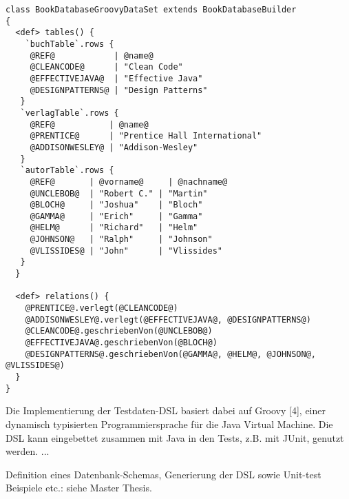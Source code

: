 \begin{lstlisting}[caption=DataSet modelliert mit dem Table Builder API, style=java, label=listing:dsl]
class BookDatabaseGroovyDataSet extends BookDatabaseBuilder
{
  <def> tables() {
    `buchTable`.rows {
     @REF@            | @name@
     @CLEANCODE@      | "Clean Code"      
     @EFFECTIVEJAVA@  | "Effective Java"  
     @DESIGNPATTERNS@ | "Design Patterns" 
   }
   `verlagTable`.rows {
     @REF@           | @name@
     @PRENTICE@      | "Prentice Hall International"
     @ADDISONWESLEY@ | "Addison-Wesley"
   }
   `autorTable`.rows {
     @REF@       | @vorname@     | @nachname@
     @UNCLEBOB@  | "Robert C." | "Martin"
     @BLOCH@     | "Joshua"    | "Bloch"
     @GAMMA@     | "Erich"     | "Gamma"
     @HELM@      | "Richard"   | "Helm"
     @JOHNSON@   | "Ralph"     | "Johnson"
     @VLISSIDES@ | "John"      | "Vlissides"    
   }
  }

  <def> relations() {
    @PRENTICE@.verlegt(@CLEANCODE@)
    @ADDISONWESLEY@.verlegt(@EFFECTIVEJAVA@, @DESIGNPATTERNS@)
    @CLEANCODE@.geschriebenVon(@UNCLEBOB@)
    @EFFECTIVEJAVA@.geschriebenVon(@BLOCH@)
    @DESIGNPATTERNS@.geschriebenVon(@GAMMA@, @HELM@, @JOHNSON@, @VLISSIDES@)
  }
}
\end{lstlisting}


Die Implementierung der Testdaten-DSL basiert dabei auf Groovy [4], einer dynamisch typisierten Programmiersprache für die Java Virtual Machine. Die DSL kann eingebettet zusammen mit Java in den Tests, z.B. mit JUnit, genutzt werden.
...

Definition eines Datenbank-Schemas, Generierung der DSL sowie Unit-test Beispiele etc.: siehe Master Thesis.



%
%
%
%	
%	
%	
%	
%
%	
%	
%	
%	
%	
	
